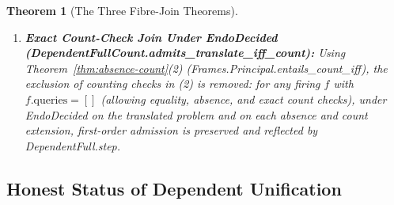 \documentclass[11pt,a4paper]{article}
\newtheorem{theorem}{Theorem}[section]
\theoremstyle{definition}
\DeclareRobustCommand{\lean}[1]{%
  \ifmmode\text{\normalfont\ttfamily\footnotesize\detokenize{#1}}%
  \else{\normalfont\footnotesize\leanurl{#1}}\fi}
\def\lean#1{#1}%
\begin{document}
\begin{theorem}[The Three Fibre-Join Theorems]
\begin{enumerate}[leftmargin=2em, nosep]
  \item \textbf{Exact Count-Check Join Under \lean{EndoDecided} (\lean{DependentFullCount.admits_translate_iff_count}):}
  Using Theorem~\ref{thm:absence-count}(2) (\lean{Frames.Principal.entails_count_iff}), the exclusion of counting checks in (2) is removed: for any firing $f$ with $f.\mathrm{queries} = []$ (allowing equality, absence, and exact count checks), under \lean{EndoDecided} on the translated problem and on each absence and count extension, first-order admission is preserved and reflected by \lean{DependentFull.step}.
\end{enumerate}
\end{theorem}

\subsection{Honest Status of Dependent Unification}
\end{document}
